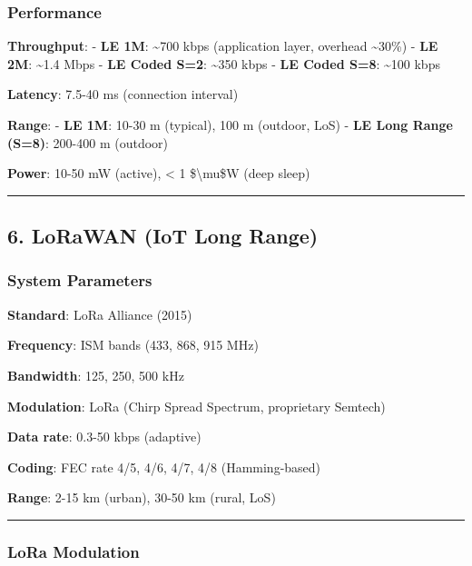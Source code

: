 \subsubsection{Performance}\label{performance-4}

\textbf{Throughput}: - \textbf{LE 1M}: \textasciitilde700 kbps
(application layer, overhead \textasciitilde30\%) - \textbf{LE 2M}:
\textasciitilde1.4 Mbps - \textbf{LE Coded S=2}: \textasciitilde350 kbps
- \textbf{LE Coded S=8}: \textasciitilde100 kbps

\textbf{Latency}: 7.5-40 ms (connection interval)

\textbf{Range}: - \textbf{LE 1M}: 10-30 m (typical), 100 m (outdoor,
LoS) - \textbf{LE Long Range (S=8)}: 200-400 m (outdoor)

\textbf{Power}: 10-50 mW (active), \textless{} 1 \$\textbackslash mu\$W
(deep sleep)

\begin{center}\rule{0.5\linewidth}{0.5pt}\end{center}

\subsection{6. LoRaWAN (IoT Long Range)}\label{lorawan-iot-long-range}

\subsubsection{System Parameters}\label{system-parameters-5}

\textbf{Standard}: LoRa Alliance (2015)

\textbf{Frequency}: ISM bands (433, 868, 915 MHz)

\textbf{Bandwidth}: 125, 250, 500 kHz

\textbf{Modulation}: LoRa (Chirp Spread Spectrum, proprietary Semtech)

\textbf{Data rate}: 0.3-50 kbps (adaptive)

\textbf{Coding}: FEC rate 4/5, 4/6, 4/7, 4/8 (Hamming-based)

\textbf{Range}: 2-15 km (urban), 30-50 km (rural, LoS)

\begin{center}\rule{0.5\linewidth}{0.5pt}\end{center}

\subsubsection{LoRa Modulation}\label{lora-modulation}

